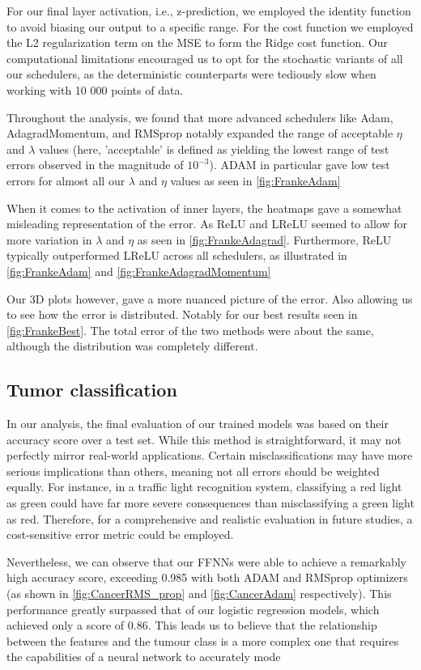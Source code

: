 \documentclass{article}
\theoremstyle{definition}
\begin{document}
For our final layer activation, i.e., z-prediction, we employed the identity function to avoid biasing our output to a specific range. For the cost function we employed the L2 regularization term on the MSE to form the Ridge cost function. Our computational limitations encouraged us to opt for the stochastic variants of all our schedulers, as the deterministic counterparts were tediously slow when working with 10 000 points of data.

Throughout the analysis, we found that more advanced schedulers like Adam, AdagradMomentum, and RMSprop notably expanded the range of acceptable $\eta$ and $\lambda$ values (here, 'acceptable' is defined as yielding the lowest range of test errors observed in the magnitude of $10^{-3}$). ADAM in particular gave low test errors for almost all our $\lambda$ and $\eta$ values as seen in \autoref{fig:FrankeAdam} 

When it comes to the activation of inner layers, the heatmaps gave a somewhat misleading representation of the error. As ReLU and LReLU seemed to allow for more variation in $\lambda$  and $\eta$ as seen in  \autoref{fig:FrankeAdagrad}. Furthermore, ReLU typically outperformed LReLU across all schedulers, as illustrated in \autoref{fig:FrankeAdam} and \autoref{fig:FrankeAdagradMomentum}

Our 3D plots however, gave a more nuanced picture of the error. Also allowing us to see how the error is distributed. Notably for our best results seen in \autoref{fig:FrankeBest}. The total error of the two methods were about the same, although the distribution was completely different.

\subsection{Tumor classification}
In our analysis, the final evaluation of our trained models was based on their accuracy score over a test set. While this method is straightforward, it may not perfectly mirror real-world applications. Certain misclassifications may have more serious implications than others, meaning not all errors should be weighted equally. For instance, in a traffic light recognition system, classifying a red light as green could have far more severe consequences than misclassifying a green light as red. Therefore, for a comprehensive and realistic evaluation in future studies, a cost-sensitive error metric could be employed.

Nevertheless, we can observe that our FFNNs were able to achieve a remarkably high accuracy score, exceeding 0.985 with both ADAM and RMSprop optimizers (as shown in \autoref{fig:CancerRMS_prop} and \autoref{fig:CancerAdam} respectively). This performance greatly surpassed that of our logistic regression models, which achieved only a score of 0.86. This leads us to believe that the relationship between the features and the tumour class is a more complex one that requires the capabilities of a neural network to accurately mode
\end{document}
